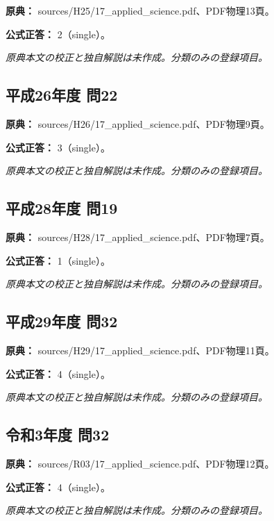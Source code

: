 \noindent\textbf{原典：} sources/H25/17\_applied\_science.pdf、PDF物理13頁。

\textbf{公式正答：} 2（single）。

\par\textit{原典本文の校正と独自解説は未作成。分類のみの登録項目。}

\subsection{平成26年度 問22}
\label{q:h26-reg-applied-22}

\noindent\textbf{原典：} sources/H26/17\_applied\_science.pdf、PDF物理9頁。

\textbf{公式正答：} 3（single）。

\par\textit{原典本文の校正と独自解説は未作成。分類のみの登録項目。}

\subsection{平成28年度 問19}
\label{q:h28-reg-applied-19}

\noindent\textbf{原典：} sources/H28/17\_applied\_science.pdf、PDF物理7頁。

\textbf{公式正答：} 1（single）。

\par\textit{原典本文の校正と独自解説は未作成。分類のみの登録項目。}

\subsection{平成29年度 問32}
\label{q:h29-reg-applied-32}

\noindent\textbf{原典：} sources/H29/17\_applied\_science.pdf、PDF物理11頁。

\textbf{公式正答：} 4（single）。

\par\textit{原典本文の校正と独自解説は未作成。分類のみの登録項目。}

\subsection{令和3年度 問32}
\label{q:r03-reg-applied-32}

\noindent\textbf{原典：} sources/R03/17\_applied\_science.pdf、PDF物理12頁。

\textbf{公式正答：} 4（single）。

\par\textit{原典本文の校正と独自解説は未作成。分類のみの登録項目。}

